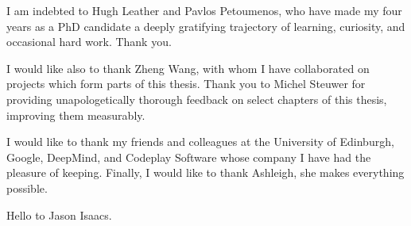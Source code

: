 I am indebted to Hugh Leather and Pavlos Petoumenos, who have made my four years as a PhD candidate a deeply gratifying trajectory of learning, curiosity, and occasional hard work. Thank you.

I would like also to thank Zheng Wang, with whom I have collaborated on projects which form parts of this thesis. Thank you to Michel Steuwer for providing unapologetically thorough feedback on select chapters of this thesis, improving them measurably.

I would like to thank my friends and colleagues at the University of Edinburgh, Google, DeepMind, and Codeplay Software whose company I have had the pleasure of keeping. Finally, I would like to thank Ashleigh, she makes everything possible.

Hello to Jason Isaacs.